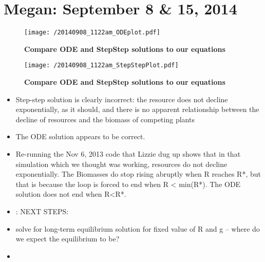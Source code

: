 \documentclass[11pt,a4paper,oneside]{article}
\begin{document}
\section{Megan: September 8 & 15, 2014}
\begin{figure}[h!]
\centering
\noindent \texttt{[image: /20140908\_1122am\_ODEplot.pdf]}
\caption{{\bf Compare ODE and StepStep solutions to our equations}}
\end{figure}

\begin{figure}[h!]
\centering
\noindent \texttt{[image: /20140908\_1122am\_StepStepPlot.pdf]}
\caption{{\bf Compare ODE and StepStep solutions to our equations}}
\end{figure}

\begin{itemize}
\item Step-step solution is clearly incorrect: the resource does not decline exponentially, as it should, and there is no apparent relationship between the decline of resources and the biomass of competing plants
\item The ODE solution appears to be correct.
\item Re-running the Nov 6, 2013 code that Lizzie dug up shows that in that simulation which we thought was working, resources do not decline exponentially.  The Biomasses do stop rising abruptly when R reaches R*, but that is because the loop is forced to end when R < min(R*).  The ODE solution does not end when R<R*.
\item: NEXT  STEPS: 
\item solve for long-term equilibrium solution for fixed value of R and g -- where do we expect the equilibrium to be?
\item 
\end{itemize}
\end{document}
